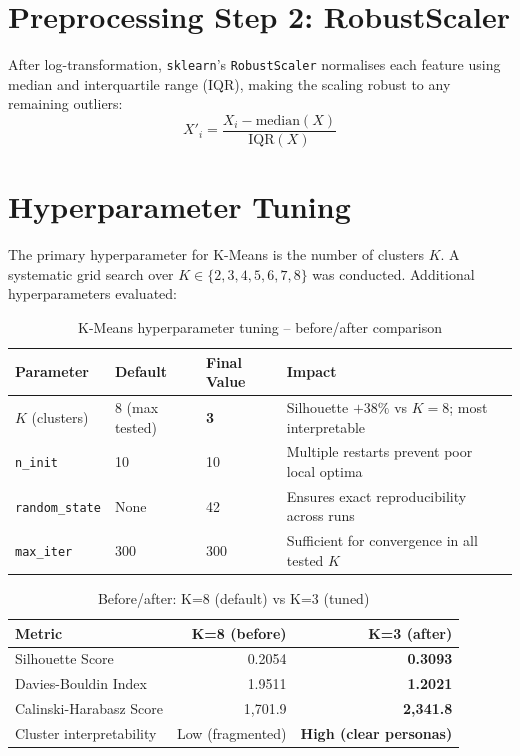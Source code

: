 \documentclass[12pt,a4paper]{report}
\begin{document}
\section{Preprocessing Step 2: RobustScaler}

After log-transformation, \texttt{sklearn}'s \texttt{RobustScaler} normalises each feature using median and interquartile range (IQR), making the scaling robust to any remaining outliers:
\[
X'_i = \frac{X_i - \text{median}(X)}{\text{IQR}(X)}
\]

\section{Hyperparameter Tuning}

The primary hyperparameter for K-Means is the number of clusters $K$. A systematic grid search over $K \in \{2, 3, 4, 5, 6, 7, 8\}$ was conducted. Additional hyperparameters evaluated:

\begin{table}[H]
\centering
\caption{K-Means hyperparameter tuning -- before/after comparison}
\begin{tabularx}{\textwidth}{lllX}
\toprule
\textbf{Parameter} & \textbf{Default} & \textbf{Final Value} & \textbf{Impact} \\
\midrule
$K$ (clusters) & 8 (max tested) & \textbf{3} & Silhouette $+38\%$ vs $K=8$; most interpretable \\
\texttt{n\_init} & 10 & 10 & Multiple restarts prevent poor local optima \\
\texttt{random\_state} & None & 42 & Ensures exact reproducibility across runs \\
\texttt{max\_iter} & 300 & 300 & Sufficient for convergence in all tested $K$ \\
\bottomrule
\end{tabularx}
\end{table}

\begin{table}[H]
\centering
\caption{Before/after: K=8 (default) vs K=3 (tuned)}
\begin{tabular}{lrr}
\toprule
\textbf{Metric} & \textbf{K=8 (before)} & \textbf{K=3 (after)} \\
\midrule
Silhouette Score & 0.2054 & \textbf{0.3093} \\
Davies-Bouldin Index & 1.9511 & \textbf{1.2021} \\
Calinski-Harabasz Score & 1,701.9 & \textbf{2,341.8} \\
Cluster interpretability & Low (fragmented) & \textbf{High (clear personas)} \\
\bottomrule
\end{tabular}
\end{table}
\end{document}
